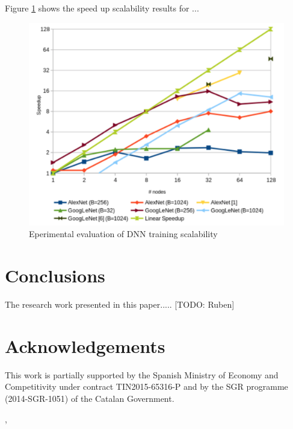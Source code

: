 \documentclass[journal]{IEEEtran}
\begin{document}
Figure \ref{fig:speedup1} shows the speed up scalability results for ...

\begin{figure}
\begin{center}
\centerline{\includegraphics[width=1.0\linewidth]{img/speedup}}
\caption{Eperimental evaluation of DNN training scalability}
\label{fig:speedup1}
\end{center}
\vspace{-0.5cm}
\end{figure}


\section{Conclusions}
The research work presented in this paper..... 
[TODO: Ruben]

\section*{Acknowledgements}
This work is partially supported by the Spanish Ministry of Economy and Competitivity under contract TIN2015-65316-P and by the SGR programme (2014-SGR-1051) of the Catalan Government.

\begin{small}
,

\end{small}
\end{document}
